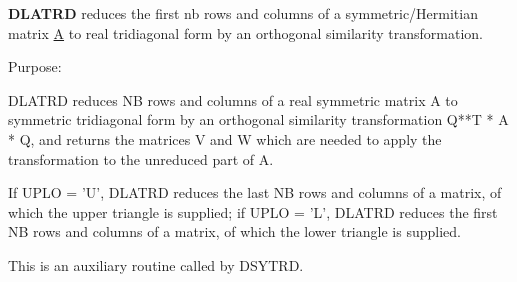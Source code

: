 {\bfseries D\+L\+A\+T\+R\+D} reduces the first nb rows and columns of a symmetric/\+Hermitian matrix \hyperlink{classA}{A} to real tridiagonal form by an orthogonal similarity transformation. 

 \begin{DoxyParagraph}{Purpose\+: }
\begin{DoxyVerb} DLATRD reduces NB rows and columns of a real symmetric matrix A to
 symmetric tridiagonal form by an orthogonal similarity
 transformation Q**T * A * Q, and returns the matrices V and W which are
 needed to apply the transformation to the unreduced part of A.

 If UPLO = 'U', DLATRD reduces the last NB rows and columns of a
 matrix, of which the upper triangle is supplied;
 if UPLO = 'L', DLATRD reduces the first NB rows and columns of a
 matrix, of which the lower triangle is supplied.

 This is an auxiliary routine called by DSYTRD.\end{DoxyVerb}
 
\end{DoxyParagraph}

